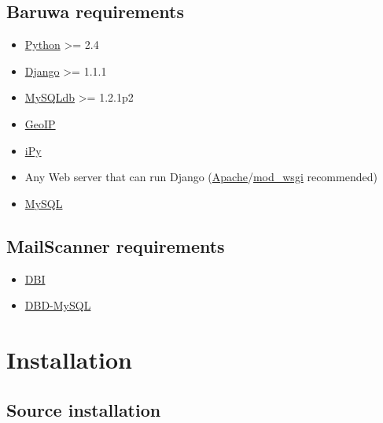 \documentclass[a4paper,10pt,english]{manual}
\begin{document}
\section{Baruwa requirements}
\begin{itemize}
\item {} 
\href{http://www.python.org/}{Python} \textgreater{}= 2.4

\item {} 
\href{http://www.djangoproject.com/}{Django} \textgreater{}= 1.1.1

\item {} 
\href{http://mysql-python.sourceforge.net/}{MySQLdb} \textgreater{}= 1.2.1p2

\item {} 
\href{http://www.maxmind.com/app/python}{GeoIP}

\item {} 
\href{http://software.inl.fr/trac/wiki/IPy}{iPy}

\item {} 
Any Web server that can run Django (\href{http://httpd.apache.org/}{Apache}/\href{http://code.google.com/p/modwsgi/}{mod\_wsgi} recommended)

\item {} 
\href{http://www.mysql.com}{MySQL}

\end{itemize}


\section{MailScanner requirements}
\begin{itemize}
\item {} 
\href{http://dbi.perl.org/}{DBI}

\item {} 
\href{http://search.cpan.org/dist/DBD-mysql/}{DBD-MySQL}

\end{itemize}

\resetcurrentobjects
\hypertarget{--doc-install}{}

\hypertarget{install}{}\chapter{Installation}


\section{Source installation}
\end{document}
